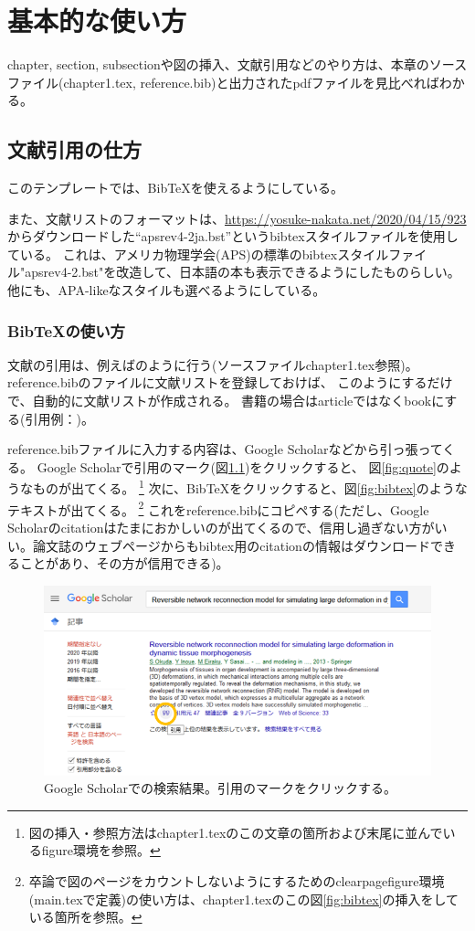 \chapter{基本的な使い方}
chapter, section, subsectionや図の挿入、文献引用などのやり方は、本章のソースファイル(chapter1.tex, reference.bib)と出力されたpdfファイルを見比べればわかる。
\section{文献引用の仕方}
このテンプレートでは、BibTeXを使えるようにしている。

また、文献リストのフォーマットは、\url{https://yosuke-nakata.net/2020/04/15/923}からダウンロードした``apsrev4-2ja.bst''というbibtexスタイルファイルを使用している。
これは、アメリカ物理学会(APS)の標準のbibtexスタイルファイル"apsrev4-2.bst"を改造して、日本語の本も表示できるようにしたものらしい。
他にも、APA-likeなスタイルも選べるようにしている。
\subsection{BibTeXの使い方}
文献の引用は、例えば\cite{Okuda2013a}のように行う(ソースファイルchapter1.tex参照)。 
reference.bibのファイルに文献リストを登録しておけば、
このようにするだけで、自動的に文献リストが作成される。
書籍の場合はarticleではなくbookにする(引用例：\cite{jt})。

reference.bibファイルに入力する内容は、Google Scholarなどから引っ張ってくる。
Google Scholarで引用のマーク(図\ref{fig:googleScholar})をクリックすると、
図\ref{fig:quote}のようなものが出てくる。
\footnote{図の挿入・参照方法はchapter1.texのこの文章の箇所および末尾に並んでいるfigure環境を参照。}
次に、BibTeXをクリックすると、図\ref{fig:bibtex}のようなテキストが出てくる。
\footnote{卒論で図のページをカウントしないようにするためのclearpagefigure環境(main.texで定義)の使い方は、chapter1.texのこの図\ref{fig:bibtex}の挿入をしている箇所を参照。}
これをreference.bibにコピペする(ただし、Google Scholarのcitationはたまにおかしいのが出てくるので、信用し過ぎない方がいい。論文誌のウェブページからもbibtex用のcitationの情報はダウンロードできることがあり、その方が信用できる)。

\begin{figure}[htbp]
	\centering
	\includegraphics[width=12cm,clip]{fig/googleScholar.png}
	\caption{Google Scholarでの検索結果。引用のマークをクリックする。}
	\label{fig:googleScholar}
\end{figure}

